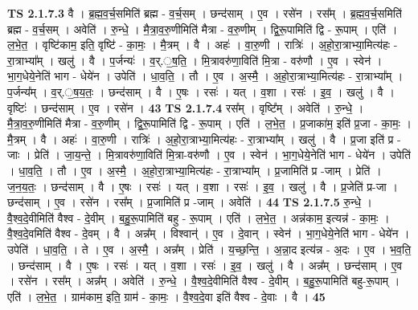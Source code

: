 \documentclass[17pt]{extarticle}
\begin{document}
                  \newline
                                \textbf{ TS 2.1.7.3} \newline
                  वै । ब्र॒ह्म॒व॒र्च॒समिति॑ ब्रह्म - व॒र्च॒सम् । छन्द॑साम् । ए॒व । रसे॑न । रस᳚म् । ब्र॒ह्म॒व॒र्च॒समिति॑ ब्रह्म - व॒र्च॒सम् । अवेति॑ । रु॒न्धे॒ । मै॒त्रा॒व॒रु॒णीमिति॑ मैत्रा - व॒रु॒णीम् । द्वि॒रू॒पामिति॑ द्वि - रू॒पाम् । एति॑ । ल॒भे॒त॒ । वृष्टि॑काम॒ इति॒ वृष्टि॑ - का॒मः॒ । मै॒त्रम् । वै । अहः॑ । वा॒रु॒णी । रात्रिः॑ । अ॒हो॒रा॒त्राभ्या॒मित्य॑हः - रा॒त्राभ्या᳚म् । खलु॑ । वै । प॒र्जन्यः॑ । व॒र्.॒ष॒ति॒ । मि॒त्रावरु॑णा॒विति॑ मि॒त्रा - वरु॑णौ । ए॒व । स्वेन॑ । भा॒ग॒धेये॒नेति॑ भाग - धेये॑न । उपेति॑ । धा॒व॒ति॒ । तौ । ए॒व । अ॒स्मै॒ । अ॒हो॒रा॒त्राभ्या॒मित्य॑हः - रा॒त्राभ्या᳚म् । प॒र्जन्य᳚म् । व॒र्.॒ष॒य॒तः॒ । छन्द॑साम् । वै । ए॒षः । रसः॑ । यत् । व॒शा । रसः॑ । इ॒व॒ । खलु॑ । वै । वृष्टिः॑ । छन्द॑साम् । ए॒व । रसे॑न । \textbf{  43} \newline
                  \newline
                                \textbf{ TS 2.1.7.4} \newline
                  रस᳚म् । वृष्टि᳚म् । अवेति॑ । रु॒न्धे॒ । मै॒त्रा॒व॒रु॒णीमिति॑ मैत्रा - व॒रु॒णीम् । द्वि॒रू॒पामिति॑ द्वि - रू॒पाम् । एति॑ । ल॒भे॒त॒ । प्र॒जाका॑म॒ इति॑ प्र॒जा - का॒मः॒ । मै॒त्रम् । वै । अहः॑ । वा॒रु॒णी । रात्रिः॑ । अ॒हो॒रा॒त्राभ्या॒मित्य॑हः - रा॒त्राभ्या᳚म् । खलु॑ । वै । प्र॒जा इति॑ प्र - जाः । प्रेति॑ । जा॒य॒न्ते॒ । मि॒त्रावरु॑णा॒विति॑ मि॒त्रा-वरु॑णौ । ए॒व । स्वेन॑ । भा॒ग॒धेये॒नेति॑ भाग - धेये॑न । उपेति॑ । धा॒व॒ति॒ । तौ । ए॒व । अ॒स्मै॒ । अ॒हो॒रा॒त्राभ्या॒मित्य॑हः - रा॒त्राभ्या᳚म् । प्र॒जामिति॑ प्र -जाम् । प्रेति॑ । ज॒न॒य॒तः॒ । छन्द॑साम् । वै । ए॒षः । रसः॑ । यत् । व॒शा । रसः॑ । इ॒व॒ । खलु॑ । वै । प्र॒जेति॑ प्र-जा । छन्द॑साम् । ए॒व । रसे॑न । रस᳚म् । प्र॒जामिति॑ प्र -जाम् । अवेति॑ । \textbf{  44} \newline
                  \newline
                                \textbf{ TS 2.1.7.5} \newline
                  रु॒न्धे॒ । वै॒श्व॒दे॒वीमिति॑ वैश्व - दे॒वीम् । ब॒हु॒रू॒पामिति॑ बहु - रू॒पाम् । एति॑ । ल॒भे॒त॒ । अन्न॑काम॒ इत्यन्न॑ - का॒मः॒ । वै॒श्व॒दे॒वमिति॑ वैश्व - दे॒वम् । वै । अन्न᳚म् । विश्वान्॑ । ए॒व । दे॒वान् । स्वेन॑ । भा॒ग॒धेये॒नेति॑ भाग - धेये॑न । उपेति॑ । धा॒व॒ति॒ । ते । ए॒व । अ॒स्मै॒ । अन्न᳚म् । प्रेति॑ । य॒च्छ॒न्ति॒ । अ॒न्ना॒द इत्य॑न्न - अ॒दः । ए॒व । भ॒व॒ति॒ । छन्द॑साम् । वै । ए॒षः । रसः॑ । यत् । व॒शा । रसः॑ । इ॒व॒ । खलु॑ । वै । अन्न᳚म् । छन्द॑साम् । ए॒व । रसे॑न । रस᳚म् । अन्न᳚म् । अवेति॑ । रु॒न्धे॒ । वै॒श्व॒दे॒वीमिति॑ वैश्व - दे॒वीम् । ब॒हु॒रू॒पामिति॑ बहु-रू॒पाम् । एति॑ । ल॒भे॒त॒ । ग्राम॑काम॒ इति॒ ग्राम॑ - का॒मः॒ । वै॒श्व॒दे॒वा इति॑ वैश्व - दे॒वाः । वै । \textbf{  45} \newline
\end{document}
